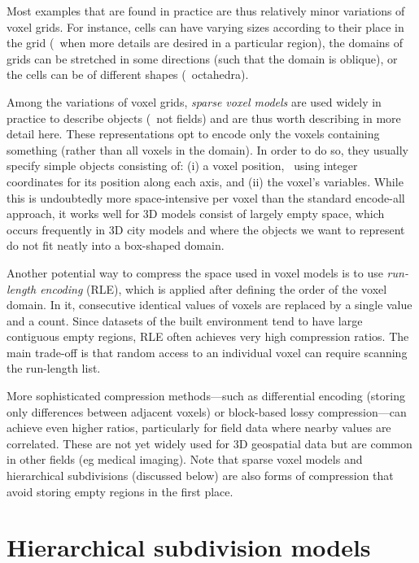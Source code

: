 Most examples that are found in practice are thus relatively minor variations of voxel grids.
For instance, cells can have varying sizes according to their place in the grid (\eg\ when more details are desired in a particular region), the domains of grids can be stretched in some directions (such that the domain is oblique), or the cells can be of different shapes (\eg\ octahedra).

Among the variations of voxel grids, \emph{sparse voxel models} are used widely in practice to describe objects (\ie\ not fields) and are thus worth describing in more detail here.
These representations opt to encode only the voxels containing something (rather than all voxels in the domain).
In order to do so, they usually specify simple objects consisting of: (i) a voxel position, \eg\ using integer coordinates for its position along each axis, and (ii) the voxel's variables.
While this is undoubtedly more space-intensive per voxel than the standard encode-all approach, it works well for 3D models consist of largely empty space, which occurs frequently in 3D city models and where the objects we want to represent do not fit neatly into a box-shaped domain.

Another potential way to compress the space used in voxel models is to use \emph{run-length encoding} (RLE), which is applied after defining the order of the voxel domain.
In it, consecutive identical values of voxels are replaced by a single value and a count.
Since datasets of the built environment tend to have large contiguous empty regions, RLE often achieves very high compression ratios.
The main trade-off is that random access to an individual voxel can require scanning the run-length list.

More sophisticated compression methods---such as differential encoding (storing only differences between adjacent voxels) or block-based lossy compression---can achieve even higher ratios, particularly for field data where nearby values are correlated.
These are not yet widely used for 3D geospatial data but are common in other fields (eg medical imaging).
Note that sparse voxel models and hierarchical subdivisions (discussed below) are also forms of compression that avoid storing empty regions in the first place.

\section{Hierarchical subdivision models}

